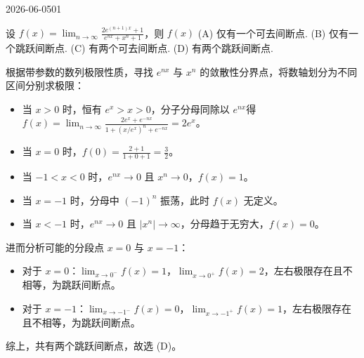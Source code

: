 \begin{mistake}{2026-06-05}{01}

\begin{problemcontent}
设 \(f(x) = \lim_{n \to \infty} \frac{2e^{(n+1)x} + 1}{e^{nx} + x^n + 1}\)，则 \(f(x)\) 
(A) 仅有一个可去间断点. 
(B) 仅有一个跳跃间断点. 
(C) 有两个可去间断点. 
(D) 有两个跳跃间断点.
\end{problemcontent}

\begin{solutioncontent}
根据带参数的数列极限性质，寻找 \(e^{nx}\) 与 \(x^n\) 的敛散性分界点，将数轴划分为不同区间分别求极限：
\begin{itemize}
    \item 当 \(x > 0\) 时，恒有 \(e^x > x > 0\)，分子分母同除以 \(e^{nx}\)得 \(f(x) = \lim_{n \to \infty} \frac{2e^x + e^{-nx}}{1 + (x/e^x)^n + e^{-nx}} = 2e^x\)。
    \item 当 \(x = 0\) 时，\(f(0) = \frac{2+1}{1+0+1} = \frac{3}{2}\)。
    \item 当 \(-1 < x < 0\) 时，\(e^{nx} \to 0\) 且 \(x^n \to 0\)，\(f(x) = 1\)。
    \item 当 \(x = -1\) 时，分母中 \((-1)^n\) 振荡，此时 \(f(x)\) 无定义。
    \item 当 \(x < -1\) 时，\(e^{nx} \to 0\) 且 \(|x^n| \to \infty\)，分母趋于无穷大，\(f(x) = 0\)。
\end{itemize}

进而分析可能的分段点 \(x=0\) 与 \(x=-1\)：
\begin{itemize}
    \item 对于 \(x=0\)：\(\lim_{x\to 0^-} f(x) = 1\)，\(\lim_{x\to 0^+} f(x) = 2\)，左右极限存在且不相等，为跳跃间断点。
    \item 对于 \(x=-1\)：\(\lim_{x\to -1^-} f(x) = 0\)，\(\lim_{x\to -1^+} f(x) = 1\)，左右极限存在且不相等，为跳跃间断点。
\end{itemize}
综上，共有两个跳跃间断点，故选 (D)。
\end{solutioncontent}


\end{mistake}
